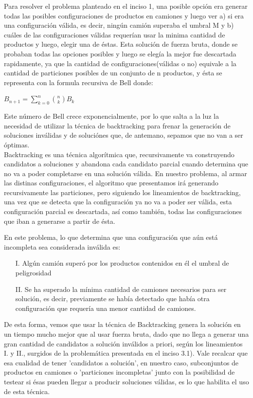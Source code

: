 \documentclass[10pt,a4paper]{article}
\begin{document}
Para resolver el problema planteado en el inciso 1, una posible opción era generar todas las posibles configuraciones de productos en camiones y luego ver a) si era una configuración válida, es decir, ningún camión superaba el umbral M y b) cuáles de las configuraciones válidas requerían usar la minima cantidad de productos y luego, elegir una de éstas.\newline
\indent Esta solución de fuerza bruta, donde se probaban todas las opciones posibles y luego se elegía la mejor fue descartada rapidamente, ya que la cantidad de configuraciones(válidas o no) equivale a la cantidad de particiones posibles de un conjunto de n productos, y ésta se representa con la formula recursiva de Bell donde:

$B_{n+1} = \sum\limits_{k=0}^n \binom {n} {k}B_k$

\noindent Este número de Bell crece exponencialmente, por lo que salta a la luz la necesidad de utilizar la técnica de backtracking para frenar la generación de soluciones inválidas y de soluciónes que, de antemano, sepamos que no van a ser óptimas.\\
\indent Backtracking es una técnica algorítmica que, recursivamente va construyendo candidatos a soluciones y abandona cada candidato parcial cuando determina que no va a poder completarse en una solución válida. En nuestro problema, al armar las distinas configuraciones, el algoritmo que presentamos irá generando recursivamente las particiones, pero siguiendo los lineamientos de backtracking, una vez que se detecta que la configuración ya no va a poder ser válida, esta configuración parcial es descartada, así como también, todas las configuraciones que iban a generarse a partir de ésta.

\bigskip
En este problema, lo que determina que una configuración que aún está incompleta sea considerada inválida es:
\begin{enumerate}

\item[I.] Algún camión superó por los productos contenidos en él el umbral de peligrosidad
\item[II.] Se ha superado la mínima cantidad de camiones necesarios para ser solución, es decir, previamente se había detectado que había otra configuración que requería una menor cantidad de camiones.

\end{enumerate}

De esta forma, vemos que usar la técnica de Backtracking genera la solución en un tiempo mucho mejor que al usar fuerza bruta, dado que no llega a generar una gran cantidad de candidatos a solución inválidos a priori, según los lineamientos I. y II., surgidos de la problemática presentada en el inciso 3.1). Vale recalcar que esa cualidad de tener 'candidatos a solución', en nuestro caso, subconjuntos de productos en camiones o 'particiones incompletas' junto con la posibilidad de testear si ésas pueden llegar a producir soluciones válidas, es lo que habilita el uso de esta técnica.
\end{document}
